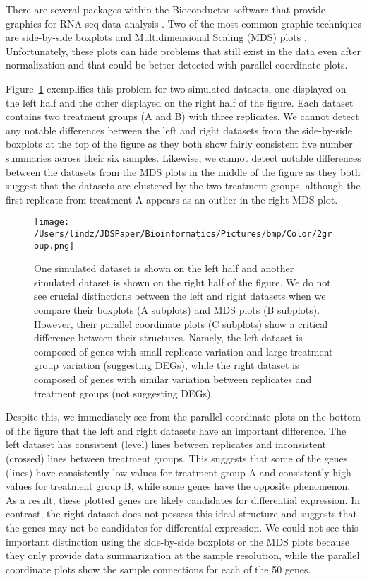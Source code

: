 \documentclass{bioinfo}
\begin{document}
There are several packages within the Bioconductor software that provide graphics for RNA-seq data analysis \citep{Huber}. Two of the most common graphic techniques are side-by-side boxplots and Multidimensional Scaling (MDS) plots \citep{Love, Risso, Robinson, Ritchie}. Unfortunately, these plots can hide problems that still exist in the data even after normalization and that could be better detected with parallel coordinate plots.

Figure~\ref{2group} exemplifies this problem for two simulated datasets, one displayed on the left half and the other displayed on the right half of the figure. Each dataset contains two treatment groups (A and B) with three replicates. We cannot detect any notable differences between the left and right datasets from the side-by-side boxplots at the top of the figure as they both show fairly consistent five number summaries across their six samples. Likewise, we cannot detect notable differences between the datasets from the MDS plots in the middle of the figure as they both suggest that the datasets are clustered by the two treatment groups, although the first replicate from treatment A appears as an outlier in the right MDS plot.

\begin{figure}[!tpb]
\centerline{\texttt{[image: /Users/lindz/JDSPaper/Bioinformatics/Pictures/bmp/Color/2group.png]}}
\caption{One simulated dataset is shown on the left half and another simulated dataset is shown on the right half of the figure. We do not see crucial distinctions between the left and right datasets when we compare their boxplots (A subplots) and MDS plots (B subplots). However, their parallel coordinate plots (C subplots) show a critical difference between their structures. Namely, the left dataset is composed of genes with small replicate variation and large treatment group variation (suggesting DEGs), while the right dataset is composed of genes with similar variation between replicates and treatment groups (not suggesting DEGs). 
\label{2group}}
\end{figure}

Despite this, we immediately see from the parallel coordinate plots on the bottom of the figure that the left and right datasets have an important difference. The left dataset has consistent (level) lines between replicates and inconsistent (crossed) lines between treatment groups. This suggests that some of the genes (lines) have consistently low values for treatment group A and consistently high values for treatment group B, while some genes have the opposite phenomenon. As a result, these plotted genes are likely candidates for differential expression. In contrast, the right dataset does not possess this ideal structure and suggests that the genes may not be candidates for differential expression. We could not see this important distinction using the side-by-side boxplots or the MDS plots because they only provide data summarization at the sample resolution, while the parallel coordinate plots show the sample connections for each of the 50 genes.
\end{document}
